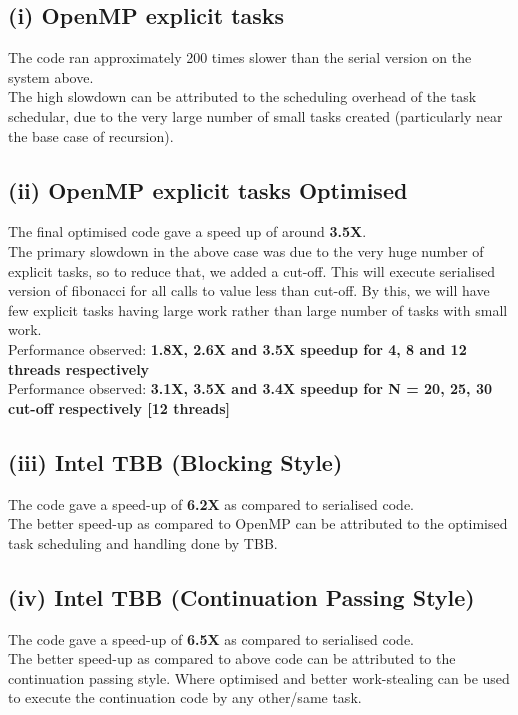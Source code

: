 \documentclass[a4paper]{article}
\begin{document}
\subsection{(i) OpenMP explicit tasks}
The code ran approximately 200 times slower than the serial version on the system above. \\
\newline
The high slowdown can be attributed to the scheduling overhead of the task schedular, due to the very large number of small tasks created (particularly near the base case of recursion).

\subsection{(ii) OpenMP explicit tasks Optimised}
The final optimised code gave a speed up of around {\bf 3.5X}.\\
\newline
The primary slowdown in the above case was due to the very huge number of explicit tasks, so to reduce that, we added a cut-off. This will execute serialised version of fibonacci for all calls to value less than cut-off. By this, we will have few explicit tasks having large work rather than large number of tasks with small work.  \\
\newline
Performance observed: {\bf 1.8X, 2.6X and 3.5X speedup for 4, 8 and 12 threads respectively} \\
Performance observed: {\bf 3.1X, 3.5X and 3.4X speedup for N = 20, 25, 30 cut-off respectively [12 threads]}

\subsection{(iii) Intel TBB (Blocking Style)}
The code gave a speed-up of {\bf 6.2X} as compared to serialised code. \\
\newline
The better speed-up as compared to OpenMP can be attributed to the optimised task scheduling and handling done by TBB.

\subsection{(iv) Intel TBB (Continuation Passing Style)}
The code gave a speed-up of {\bf 6.5X} as compared to serialised code. \\
\newline
The better speed-up as compared to above code can be attributed to the continuation passing style. Where optimised and better work-stealing can be used to execute the continuation code by any other/same task.
\end{document}
